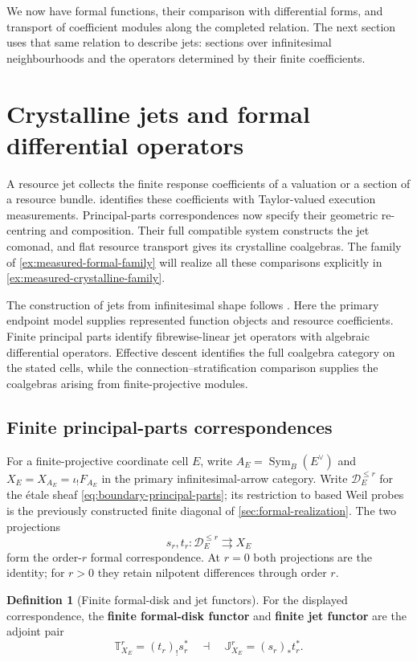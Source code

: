 \documentclass[11pt,a4paper]{article}
\numberwithin{algorithm}{section}
\numberwithin{equation}{section}
\theoremstyle{definition}
\newtheorem{definition}[definition]{Definition}
\theoremstyle{remark}
\theoremstyle{plain}
\newcommand{\Sym}{\operatorname{Sym}}
\theoremstyle{definition}
\theoremstyle{plain}
\begin{document}
We now have formal functions, their comparison with differential
forms, and transport of coefficient modules along the completed
relation. The next section uses that same relation to describe
jets: sections over infinitesimal neighbourhoods and the operators
determined by their finite coefficients.

\section{Crystalline jets and formal differential operators}
\label{sec:jets}
A resource jet collects the finite response coefficients of a valuation
or a section of a resource bundle. 
identifies these coefficients with Taylor-valued execution measurements.
Principal-parts correspondences now specify their geometric re-centring
and composition. Their full compatible system constructs the jet
comonad, and flat resource transport gives its crystalline coalgebras.
The family of \cref{ex:measured-formal-family} will realize all these
comparisons explicitly in \cref{ex:measured-crystalline-family}.

The construction of jets from infinitesimal shape follows
\citet{KS}. Here the primary endpoint model supplies represented
function objects and resource coefficients. Finite
principal parts identify fibrewise-linear jet operators with algebraic
differential operators. Effective descent identifies the full coalgebra
category on the stated cells, while the connection--stratification
comparison supplies the coalgebras arising from finite-projective modules.

\subsection{Finite principal-parts correspondences}
\label{sec:jet-formal-correspondences}
For a finite-projective coordinate cell $E$, write
$A_E=\Sym_B(E^\vee)$ and $X_E=X_{A_E}=\iota_!F_{A_E}$
in the primary infinitesimal-arrow category.
Write $\mathcal D_E^{\le r}$ for the \'etale sheaf
\eqref{eq:boundary-principal-parts}; its restriction to based
Weil probes is the previously constructed finite diagonal
of \cref{sec:formal-realization}.  The two projections
\[
 s_r,t_r:\mathcal D_E^{\le r}\rightrightarrows X_E
\]
form the order-$r$ formal correspondence.  At $r=0$ both
projections are the identity; for $r>0$ they retain
nilpotent differences through order $r$.


\begin{definition}[Finite formal-disk and jet functors]\label{def:finite-jet-functors}
For the displayed correspondence, the \textbf{finite formal-disk
functor} and \textbf{finite jet functor} are the adjoint pair
\begin{equation}\label{eq:cat-finite-correspondence-adjoints}
 \mathbb T_{X_E}^r=(t_r)_!s_r^*
 \quad\dashv\quad
 \mathbb J_{X_E}^r=(s_r)_*t_r^*.
\end{equation}
\end{definition}
\end{document}
